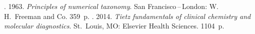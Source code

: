 








  \begin{multicols}{2}

\renewcommand{\bibname}{\protect\rmfamily References}



{\small\frenchspacing
 {%
 \begin{thebibliography}{99}


. 1963. \textit{Principles of numerical
taxonomy}. San Francisco\,--\,London: W.\,H.~Freeman and Co. 359~p.
. 2014. \textit{Tietz fundamentals of clinical
chemistry and molecular diagnostics}. St.\ Louis, MO: Elsevier Health Sciences.
1104~p.


\end{thebibliography}}}
\end{multicols}
